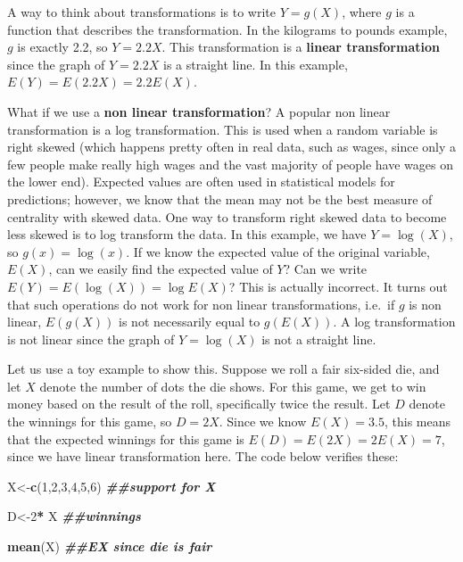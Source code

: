 \documentclass[
]{book}
\newenvironment{Shaded}{\begin{snugshade}}{\end{snugshade}}
\newcommand{\DecValTok}[1]{\textcolor[rgb]{0.00,0.00,0.81}{#1}}
\newcommand{\DocumentationTok}[1]{\textcolor[rgb]{0.56,0.35,0.01}{\textbf{\textit{#1}}}}
\newcommand{\FunctionTok}[1]{\textcolor[rgb]{0.13,0.29,0.53}{\textbf{#1}}}
\newcommand{\NormalTok}[1]{#1}
\newcommand{\OtherTok}[1]{\textcolor[rgb]{0.56,0.35,0.01}{#1}}
\newcommand{\SpecialCharTok}[1]{\textcolor[rgb]{0.81,0.36,0.00}{\textbf{#1}}}
\begin{document}
A way to think about transformations is to write \(Y = g(X)\), where \(g\) is a function that describes the transformation. In the kilograms to pounds example, \(g\) is exactly 2.2, so \(Y = 2.2X\). This transformation is a \textbf{linear transformation} since the graph of \(Y = 2.2X\) is a straight line. In this example, \(E(Y) = E(2.2X) = 2.2E(X)\).

What if we use a \textbf{non linear transformation}? A popular non linear transformation is a log transformation. This is used when a random variable is right skewed (which happens pretty often in real data, such as wages, since only a few people make really high wages and the vast majority of people have wages on the lower end). Expected values are often used in statistical models for predictions; however, we know that the mean may not be the best measure of centrality with skewed data. One way to transform right skewed data to become less skewed is to log transform the data. In this example, we have \(Y = \log(X)\), so \(g(x) = \log(x)\). If we know the expected value of the original variable, \(E(X)\), can we easily find the expected value of \(Y\)? Can we write \(E(Y) = E(\log(X)) = \log E(X)\)? This is actually incorrect. It turns out that such operations do not work for non linear transformations, i.e.~if \(g\) is non linear, \(E(g(X))\) is not necessarily equal to \(g(E(X))\). A log transformation is not linear since the graph of \(Y = \log(X)\) is not a straight line.

Let us use a toy example to show this. Suppose we roll a fair six-sided die, and let \(X\) denote the number of dots the die shows. For this game, we get to win money based on the result of the roll, specifically twice the result. Let \(D\) denote the winnings for this game, so \(D = 2X\). Since we know \(E(X) = 3.5\), this means that the expected winnings for this game is \(E(D) = E(2X) = 2E(X) = 7\), since we have linear transformation here. The code below verifies these:

\begin{Shaded}
\begin{Highlighting}[]
\NormalTok{X}\OtherTok{\textless{}{-}}\FunctionTok{c}\NormalTok{(}\DecValTok{1}\NormalTok{,}\DecValTok{2}\NormalTok{,}\DecValTok{3}\NormalTok{,}\DecValTok{4}\NormalTok{,}\DecValTok{5}\NormalTok{,}\DecValTok{6}\NormalTok{) }\DocumentationTok{\#\#support for X}

\NormalTok{D}\OtherTok{\textless{}{-}}\DecValTok{2}\SpecialCharTok{*}\NormalTok{ X }\DocumentationTok{\#\#winnings}

\FunctionTok{mean}\NormalTok{(X) }\DocumentationTok{\#\#EX since die is fair}
\end{Highlighting}
\end{Shaded}
\end{document}

